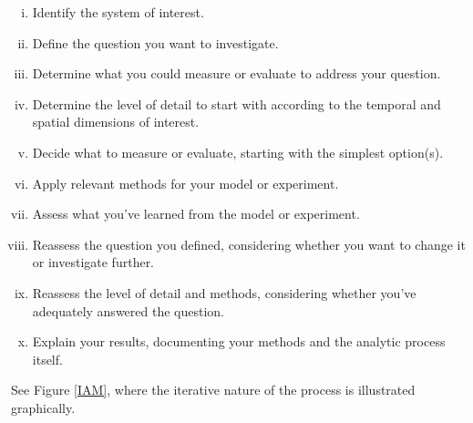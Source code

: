 \documentclass[10pt]{article}
\begin{document}
{\selectfont
\begin{enumerate}[(i)]
    \item Identify the system of interest.
    \item Define the question you want to investigate.
    \item Determine what you could measure or evaluate to address your question.
    \item Determine the level of detail to start with according to the temporal and spatial dimensions of interest.
    \item Decide what to measure or evaluate, starting with the simplest option(s).
    \item Apply relevant methods for your model or experiment.
    \item Assess what you've learned from the model or experiment.
    \item Reassess the question you defined, considering whether you want to change it or investigate further.
    \item Reassess the level of detail and methods, considering whether you've adequately answered the question.
    \item Explain your results, documenting your methods and the analytic process itself.
\end{enumerate}
}

See Figure \ref{IAM}, where the iterative nature of the process is illustrated graphically.
\end{document}

